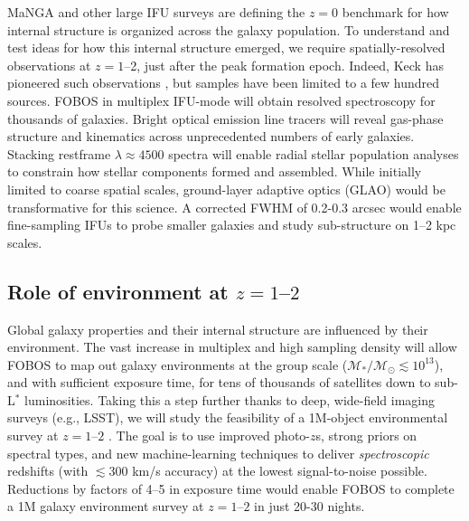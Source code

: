 MaNGA \citep{bundy15} and other large IFU surveys are defining the
$z=0$ benchmark for how internal structure is organized across the
galaxy population. To understand and test ideas for how this internal
structure emerged, we require spatially-resolved observations at $z =
1$--2, just after the peak formation epoch. Indeed, Keck has
pioneered such observations \citep[e.g.,][]{erb04, miller11,law09},
but samples have been limited to a few hundred sources. FOBOS in
multiplex IFU-mode will obtain resolved spectroscopy for thousands of
galaxies. Bright optical emission line tracers will reveal gas-phase
structure and kinematics across unprecedented numbers of early
galaxies. Stacking restframe $\lambda \approx 4500$ spectra will
enable radial stellar population analyses to constrain how stellar
components formed and assembled. While initially limited to coarse
spatial scales, ground-layer adaptive optics (GLAO) would be
transformative for this science. A corrected FWHM of 0.2-0.3 arcsec
would enable fine-sampling IFUs to probe smaller galaxies and study
sub-structure on 1--2 kpc scales.

\subsection{Role of environment at $z=1$--$2$ }

Global galaxy properties and their internal structure are influenced
by their environment. The vast increase in multiplex and high
sampling density will allow FOBOS to map out galaxy environments at
the group scale ($\mathcal{M_\ast/M_\odot} \lesssim 10^{13}$), and
with sufficient exposure time, for tens of thousands of satellites
down to sub-L$^*$ luminosities. Taking this a step further thanks to
deep, wide-field imaging surveys (e.g., LSST), we will study the
feasibility of a 1M-object environmental survey at $z=1$--$2$ . The
goal is to use improved photo-$z$s, strong priors on spectral types,
and new machine-learning techniques to deliver {\it spectroscopic}
redshifts (with $\lesssim$300 km/s accuracy) at the lowest
signal-to-noise possible. Reductions by factors of 4--5 in exposure
time would enable FOBOS to complete a 1M galaxy environment survey at
$z=1$--$2$ in just 20-30 nights.



